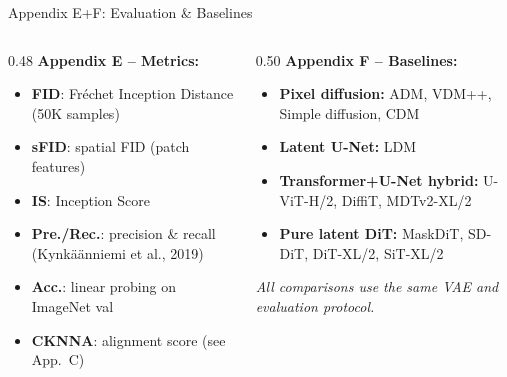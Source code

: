 \documentclass[aspectratio=169, 10pt]{beamer}
\begin{document}
\begin{frame}{Appendix E+F: Evaluation \& Baselines}
\small
\begin{columns}[T]
\begin{column}{0.48\textwidth}
\textbf{Appendix E -- Metrics:}
\begin{itemize}\setlength{\itemsep}{2pt}
  \item \textbf{FID}: Fr\'{e}chet Inception Distance (50K samples)
  \item \textbf{sFID}: spatial FID (patch features)
  \item \textbf{IS}: Inception Score
  \item \textbf{Pre./Rec.}: precision \& recall (Kynk\"{a}\"{a}nniemi et al., 2019)
  \item \textbf{Acc.}: linear probing on ImageNet val
  \item \textbf{CKNNA}: alignment score (see App.\ C)
\end{itemize}
\end{column}
\begin{column}{0.50\textwidth}
\textbf{Appendix F -- Baselines:}
\begin{itemize}\setlength{\itemsep}{2pt}
  \item \textbf{Pixel diffusion:} ADM, VDM++, Simple diffusion, CDM
  \item \textbf{Latent U-Net:} LDM
  \item \textbf{Transformer+U-Net hybrid:} U-ViT-H/2, DiffiT, MDTv2-XL/2
  \item \textbf{Pure latent DiT:} MaskDiT, SD-DiT, DiT-XL/2, SiT-XL/2
\end{itemize}
\vspace{0.3em}
\textit{All comparisons use the same VAE and evaluation protocol.}
\end{column}
\end{columns}
\end{frame}
\end{document}
